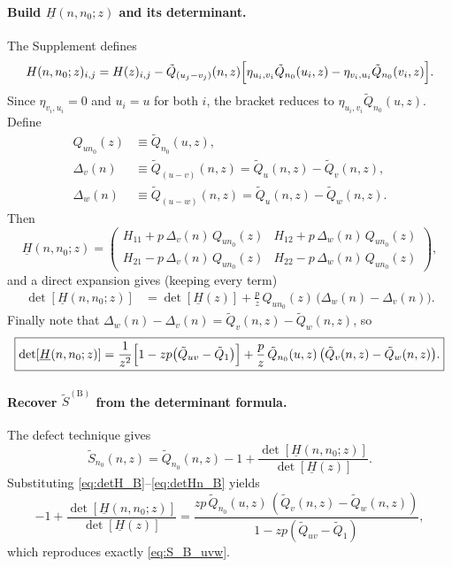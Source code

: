 \documentclass[11pt]{article}
\begin{document}
\paragraph{Build $\underline{H}(n,n_0;z)$ and its determinant.}
The Supplement defines
\[
H(n,n_0;z)_{i,j}
=
H(z)_{i,j}
-\tilde Q_{(u_j-v_j)}(n,z)\Bigl[\eta_{u_i,v_i}\tilde Q_{n_0}(u_i,z)-\eta_{v_i,u_i}\tilde Q_{n_0}(v_i,z)\Bigr].
\]
Since $\eta_{v_i,u_i}=0$ and $u_i=u$ for both $i$, the bracket reduces to $\eta_{u_i,v_i}\tilde Q_{n_0}(u,z)$.
Define
\[
\begin{aligned}
Q_{u n_0}(z) &\equiv \tilde Q_{n_0}(u,z),\\
\Delta_v(n) &\equiv \tilde Q_{(u-v)}(n,z)=\tilde Q_u(n,z)-\tilde Q_v(n,z),\\
\Delta_w(n) &\equiv \tilde Q_{(u-w)}(n,z)=\tilde Q_u(n,z)-\tilde Q_w(n,z).
\end{aligned}
\]
Then
\[
\underline{H}(n,n_0;z)=
\begin{pmatrix}
H_{11}+p\,\Delta_v(n)\,Q_{u n_0}(z) & H_{12}+p\,\Delta_w(n)\,Q_{u n_0}(z)\\
H_{21}-p\,\Delta_v(n)\,Q_{u n_0}(z) & H_{22}-p\,\Delta_w(n)\,Q_{u n_0}(z)
\end{pmatrix},
\]
and a direct expansion gives (keeping every term)
\begin{align*}
\det[\underline{H}(n,n_0;z)]
&=\det[\underline{H}(z)]
+\frac{p}{z}\,Q_{u n_0}(z)\,\bigl(\Delta_w(n)-\Delta_v(n)\bigr).
\end{align*}
Finally note that $\Delta_w(n)-\Delta_v(n)=\tilde Q_v(n,z)-\tilde Q_w(n,z)$, so
\begin{equation}
\boxed{
\det[\underline{H}(n,n_0;z)]
=
\frac{1}{z^2}\Bigl[1-z p\bigl(\tilde Q_{uv}-\tilde Q_{1}\bigr)\Bigr]
+\frac{p}{z}\,\tilde Q_{n_0}(u,z)\,\bigl(\tilde Q_v(n,z)-\tilde Q_w(n,z)\bigr).
}
\label{eq:detHn_B}
\end{equation}

\paragraph{Recover $\tilde S^{\mathrm{(B)}}$ from the determinant formula.}
The defect technique gives
\[
\tilde S_{n_0}(n,z)=\tilde Q_{n_0}(n,z)-1+\frac{\det[\underline{H}(n,n_0;z)]}{\det[\underline{H}(z)]}.
\]
Substituting \eqref{eq:detH_B}--\eqref{eq:detHn_B} yields
\[
-1+\frac{\det[\underline{H}(n,n_0;z)]}{\det[\underline{H}(z)]}
=
\frac{z p\,\tilde Q_{n_0}(u,z)\,(\tilde Q_v(n,z)-\tilde Q_w(n,z))}{1-z p(\tilde Q_{uv}-\tilde Q_{1})},
\]
which reproduces exactly \eqref{eq:S_B_uvw}.
\end{document}
